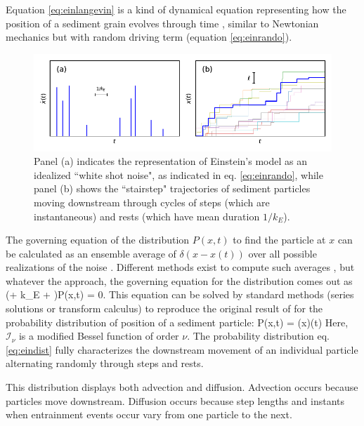 Equation \ref{eq:einlangevin} is a kind of dynamical equation representing how the position of a sediment grain evolves through time \citep{Kubo1978}, similar to Newtonian mechanics \citep{Goldstein1997} but with random driving term (equation \ref{eq:einrando}).
\begin{figure}[!htbp]
	\includegraphics[width=\linewidth,keepaspectratio]{./figures/ch1/einsteinConcept.pdf}
	\caption{Panel (a) indicates the representation of Einstein's model as an idealized ``white shot noise", as indicated in eq. \ref{eq:einrando}, while panel (b) shows the ``stairstep" trajectories of sediment particles moving downstream through cycles of steps (which are instantaneous) and rests (which have mean duration $1/k_E$). }
	\label{fig:einsteinfig}
\end{figure}

The governing equation of the distribution $P(x,t)$ to find the particle at $x$ can be calculated as an ensemble average of $\delta(x-x(t))$ over all possible realizations of the noise \citep{Risken1989,Moss1989}. Different methods exist to compute such averages \citep{Hanggi1978, Hanggi1984a, Balakrishnan1993, VanDenBroeck1983}, but whatever the approach, the governing equation for the distribution comes out as
\be  \big(\ell \px \pt + k_E \ell \px + \pt \big)P(x,t) = 0. \label{eq:einmaster}\ee
This equation can be solved by standard methods (series solutions or transform calculus) \citep{Arfken1985,Prudnikov1992a} to reproduce the original result of \citet{Einstein1937} for the probability distribution of position of a sediment particle:
\be P(x,t) = \theta(x)\theta(t) \label{eq:eindist} \ee
Here, $\mathcal{I}_\nu$ is a modified Bessel function of order $\nu$. 
The probability distribution eq. \ref{eq:eindist} fully characterizes the downstream movement of an individual particle alternating randomly through steps and rests.

This distribution displays both advection and diffusion. Advection occurs because particles move downstream. Diffusion occurs because step lengths and instants when entrainment events occur vary from one particle to the next.

